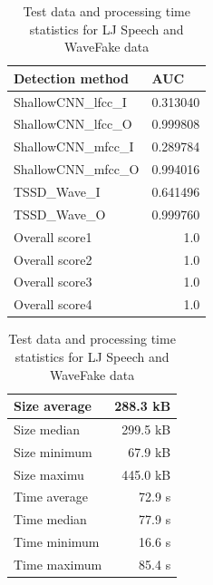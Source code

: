 \begin{table}[H]
    \begin{minipage}[c]{.5\textwidth}
        \centering
        \begin{tabular}{|l|r|}
            \hline
            Detection method & \multicolumn{1}{l|}{AUC} \\ \hline
            ShallowCNN\_lfcc\_I & 0.313040 \\ \hline
            ShallowCNN\_lfcc\_O & 0.999808 \\ \hline
            ShallowCNN\_mfcc\_I & 0.289784 \\ \hline
            ShallowCNN\_mfcc\_O & 0.994016 \\ \hline
            TSSD\_Wave\_I & 0.641496 \\ \hline
            TSSD\_Wave\_O & 0.999760 \\ \hline
            Overall score1 & 1.0 \\ \hline
            Overall score2 & 1.0 \\ \hline
            Overall score3 & 1.0 \\ \hline
            Overall score4 & 1.0 \\ \hline
        \end{tabular}
        \caption{AUC values for LJ Speech and WaveFake data}
    \end{minipage}
    \begin{minipage}[c]{.5\textwidth}
        \centering
        \begin{tabular}{|l|r|}
            \hline
            Size average & 288.3 kB \\ \hline
            Size median & 299.5 kB \\ \hline
            Size minimum & 67.9 kB \\ \hline
            Size maximu & 445.0 kB \\ \hline
            Time average & 72.9 s \\ \hline
            Time median & 77.9 s \\ \hline
            Time minimum & 16.6 s \\ \hline
            Time maximum & 85.4 s \\ \hline
        \end{tabular}
        \caption{Test data and processing time statistics for LJ Speech and WaveFake data}
        \label{table:lj_wf_statistics}
    \end{minipage}
\end{table}

